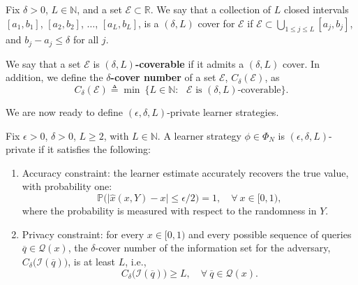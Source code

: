 \documentclass[final,12pt]{colt2018}
\def\R{\mathbb{R}}
\def\calE{\mathcal{E}}
\def\calI{\mathcal{I}}
\def\calQ{\mathcal{Q}}
\begin{document}


\begin{definition}
\label{def:coverable}
Fix $\delta>0$, $L\in\mathbb{N}$, and a set $\calE\subset \R$. We say that a collection of $L$ closed intervals $[a_1,b_1]$, $[a_2,b_2]$, $\dots$, $[a_L,b_L]$, is a $(\delta,L)$ cover for $\calE$ if  $\mathcal{E}\subset\bigcup_{1\leq j\leq L}[a_j,b_j]$,  and $b_j - a_j \leq \delta$ for all $j.$ 

We say that a set $\calE$ is {\bf $(\delta,L)$-coverable} if it admits {a} $(\delta,L)$ cover. {In addition, we define the {\bf $\delta$-cover number} of a set $\mathcal{E}$, $C_\delta(\mathcal{E})$, as
\begin{equation}
C_\delta(\mathcal{E})\triangleq\min\: \{L\in\mathbb{N}: \textrm{ $\mathcal{E}$ is $(\delta,L)$-coverable}\}.
\end{equation}}
\end{definition}

We are now ready to define $(\epsilon,\delta,L)$-private {learner} strategies.
\begin{definition}
\label{def:private_strategy}
Fix $\epsilon>0$, $\delta>0$, $L\geq 2$, with $L\in\mathbb{N}$. A {learner} strategy $\phi\in\Phi_N$ is $(\epsilon,\delta, L)$-private if it satisfies the following: 
\begin{enumerate}
\item Accuracy constraint: the {learner} estimate accurately recovers the true value, with probability one:
\begin{equation*}
\mathbb{P}\Big( \big|\hat{x}(x,Y)-x\big| \leq {\epsilon}/{2}\Big)=1, \quad \forall\: x\in[0,1), 
\end{equation*}
where the probability is measured with respect to the randomness in $Y$. 
	\item Privacy constraint: for every $x\in[0,1)$ and every possible sequence of queries $\overline{q} \in \calQ(x)$, {the $\delta$-cover number of the {information set} for the adversary, $C_\delta\big(\calI(\overline{q})\big)$, is 
	at least $L$, i.e., 
	\begin{equation}
	C_\delta\big(\calI(\overline{q})\big)\geq L,\quad\forall\: \overline{q}\in\mathcal{Q}(x).
	\end{equation} } 
\end{enumerate}
\end{definition}
\end{document}
